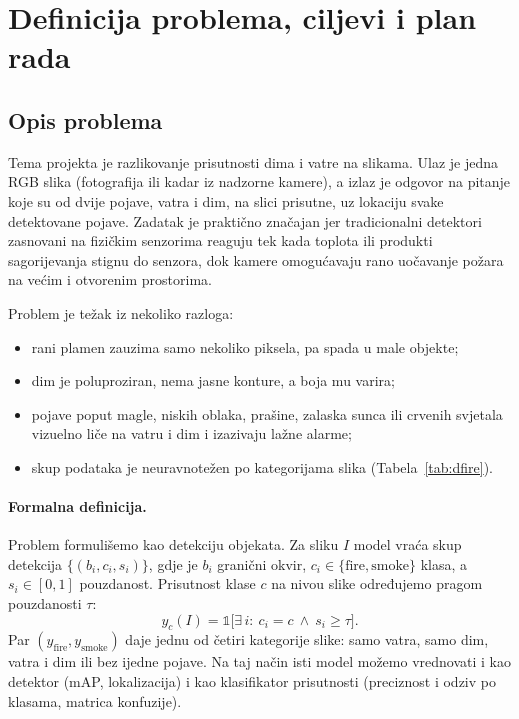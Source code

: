 \section{Definicija problema, ciljevi i plan rada}
\label{sec:problem}

\subsection{Opis problema}
Tema projekta je razlikovanje prisutnosti dima i vatre na slikama. Ulaz je jedna RGB slika (fotografija ili kadar iz nadzorne kamere), a izlaz je odgovor na pitanje koje su od dvije pojave, vatra i dim, na slici prisutne, uz lokaciju svake detektovane pojave. Zadatak je praktično značajan jer tradicionalni detektori zasnovani na fizičkim senzorima reaguju tek kada toplota ili produkti sagorijevanja stignu do senzora, dok kamere omogućavaju rano uočavanje požara na većim i otvorenim prostorima.

Problem je težak iz nekoliko razloga:
\begin{itemize}
  \item rani plamen zauzima samo nekoliko piksela, pa spada u male objekte;
  \item dim je poluproziran, nema jasne konture, a boja mu varira;
  \item pojave poput magle, niskih oblaka, prašine, zalaska sunca ili crvenih svjetala vizuelno liče na vatru i dim i izazivaju lažne alarme;
  \item skup podataka je neuravnotežen po kategorijama slika (Tabela~\ref{tab:dfire}).
\end{itemize}

\paragraph{Formalna definicija.} Problem formulišemo kao detekciju objekata. Za sliku $I$ model vraća skup detekcija $\{(b_i, c_i, s_i)\}$, gdje je $b_i$ granični okvir, $c_i \in \{\text{fire}, \text{smoke}\}$ klasa, a $s_i \in [0,1]$ pouzdanost. Prisutnost klase $c$ na nivou slike određujemo pragom pouzdanosti $\tau$:
\begin{equation}
  y_c(I) = \mathbb{1}\bigl[\exists\, i:\ c_i = c \ \wedge\ s_i \ge \tau\bigr].
  \label{eq:prisutnost}
\end{equation}
Par $(y_{\text{fire}}, y_{\text{smoke}})$ daje jednu od četiri kategorije slike: samo vatra, samo dim, vatra i dim ili bez ijedne pojave. Na taj način isti model možemo vrednovati i kao detektor (mAP, lokalizacija) i kao klasifikator prisutnosti (preciznost i odziv po klasama, matrica konfuzije).

